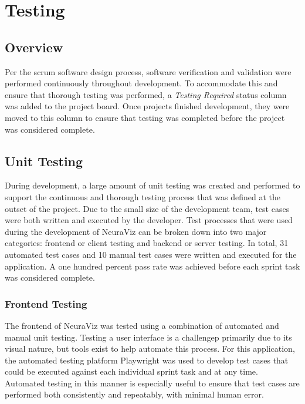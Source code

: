 \section{Testing}
\label{sec:Testing}

\subsection{Overview} 
Per the scrum software design process, software verification and validation were performed continuously throughout development. To accommodate this and ensure that thorough testing was performed, a \textit{Testing Required} status column was added to the project board. Once projects finished development, they were moved to this column to ensure that testing was completed before the project was considered complete.

\subsection{Unit Testing}
During development, a large amount of unit testing was created and performed to support the continuous and thorough testing process that was defined at the outset of the project. Due to the small size of the development team, test cases were both written and executed by the developer. Test processes that were used during the development of NeuraViz can be broken down into two major categories: frontend or client testing and backend or server testing. In total, 31 automated test cases and 10 manual test cases were written and executed for the application. A one hundred percent pass rate was achieved before each sprint task was considered complete.

\subsubsection{Frontend Testing}
The frontend of NeuraViz was tested using a combination of automated and manual unit testing. Testing a user interface is a challengep primarily due to its visual nature, but tools exist to help automate this process. For this application, the automated testing platform Playwright \cite{playwright} was used to develop test cases that could be executed against each individual sprint task and at any time. Automated testing in this manner is especially useful to ensure that test cases are performed both consistently and repeatably, with minimal human error. 

